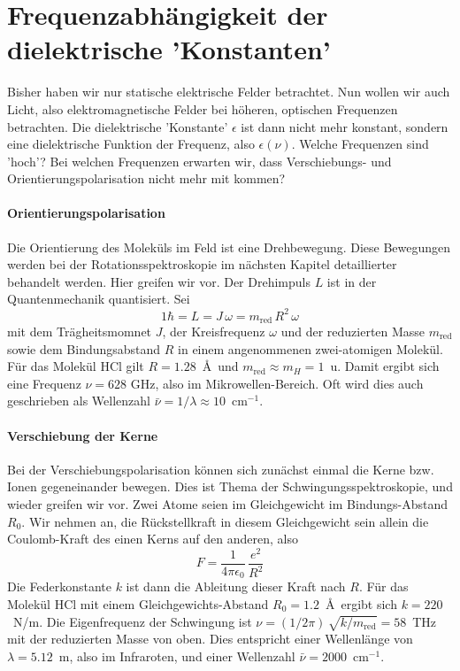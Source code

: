  
\section{Frequenzabhängigkeit der dielektrische 'Konstanten' }
 
Bisher haben wir nur statische elektrische Felder betrachtet. Nun wollen wir auch Licht, also elektromagnetische Felder bei  höheren, optischen Frequenzen  betrachten. Die dielektrische 'Konstante' $\epsilon$ ist dann nicht mehr konstant, sondern eine dielektrische Funktion der Frequenz, also $\epsilon(\nu)$. Welche Frequenzen sind 'hoch'? Bei welchen Frequenzen erwarten wir, dass Verschiebungs- und Orientierungspolarisation nicht mehr mit kommen?

\paragraph{Orientierungspolarisation} Die Orientierung des Moleküls im Feld ist eine Drehbewegung. Diese Bewegungen werden bei der Rotationsspektroskopie im nächsten Kapitel detaillierter behandelt werden. Hier greifen wir vor. Der Drehimpuls $L$ ist in der Quantenmechanik quantisiert. Sei
\begin{equation}
1 \hbar = L = J \, \omega = m_\text{red} \, R^2 \, \omega
\end{equation}
mit dem Trägheitsmomnet $J$, der Kreisfrequenz $\omega$ und der reduzierten Masse 
 $m_\text{red}$ sowie dem Bindungsabstand $R$ in einem angenommenen zwei-atomigen Molekül. Für das Molekül HCl gilt $R = 1.28$~\AA\ und $m_\text{red} \approx m_H = 1$~u. Damit ergibt sich eine Frequenz $\nu = 628$ GHz, also im Mikrowellen-Bereich. Oft wird dies auch geschrieben als Wellenzahl $\bar{\nu} = 1 /\lambda \approx 10$~cm$^{-1}$.
 
\paragraph{Verschiebung der Kerne} Bei der Verschiebungspolarisation können sich zunächst einmal die Kerne bzw. Ionen gegeneinander bewegen. Dies ist Thema der Schwingungsspektroskopie, und wieder greifen wir vor. Zwei Atome seien im Gleichgewicht  im Bindungs-Abstand $R_0$. Wir nehmen an, die Rückstellkraft in diesem Gleichgewicht sein allein die Coulomb-Kraft des einen Kerns auf den anderen, also 
\begin{equation}
F = \frac{1}{4 \pi \epsilon_0} \, \frac{e^2}{R^2}
\end{equation}
Die Federkonstante $k$ ist dann die Ableitung dieser Kraft nach $R$. Für das Molekül HCl mit einem Gleichgewichts-Abstand $R_0 = 1.2$~\AA\ ergibt sich $k = 220$~N/m. Die Eigenfrequenz der Schwingung  ist $\nu = (1/2\pi) \, \sqrt{k/m_\text{red}} = 58$~THz mit der reduzierten Masse von oben. Dies entspricht einer Wellenlänge von $\lambda = 5.12$~\textmu m, also im Infraroten, und einer Wellenzahl $\bar{\nu} = 2000$~cm$^{-1}$.

